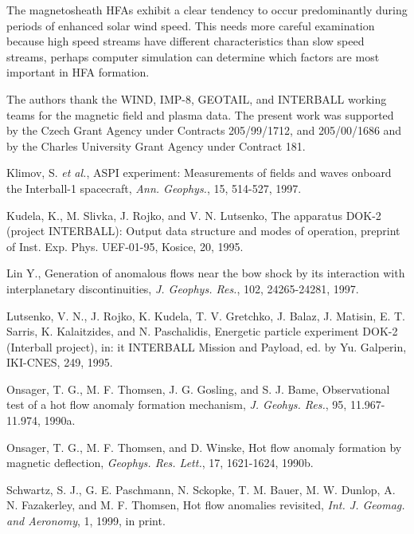 \documentclass[11pt]{article}
\begin{document}
\begin{article}
The magnetosheath HFAs exhibit a clear tendency to occur
predominantly during periods of enhanced solar wind speed.
This needs more careful examination because high speed streams
have different characteristics than slow speed streams,
perhaps computer simulation can determine which factors are
most important in HFA formation.

\acknowledgments %
{The authors thank the WIND, IMP-8, GEOTAIL, and INTERBALL working
teams for the
magnetic field and plasma data. The  present  work  was  supported by
the Czech  Grant  Agency  under  Contracts  205/99/1712, and
205/00/1686 and by the Charles University Grant Agency under
Contract 181.}

\begin{references}

{}
Klimov, S. {\it et al.}, ASPI experiment: Measurements of fields and
waves onboard the Interball-1 spacecraft, {\it Ann. Geophys.}, 15,
514-527, 1997.

Kudela, K., M. Slivka, J. Rojko, and V. N. Lutsenko, The
apparatus DOK-2 (project INTERBALL): Output data structure and
modes of operation, preprint of Inst. Exp. Phys. UEF-01-95,
Kosice, 20, 1995.

Lin Y., Generation of anomalous flows near the bow shock by
its interaction with interplanetary discontinuities, {\it J. Geophys.
Res.}, 102, 24265-24281, 1997.

Lutsenko, V. N., J. Rojko, K. Kudela, T. V. Gretchko, J. Balaz,
J. Matisin, E. T. Sarris, K. Kalaitzides, and N. Paschalidis,
Energetic particle experiment DOK-2 (Interball project), in:
{it INTERBALL Mission and Payload,} ed. by Yu. Galperin, IKI-CNES,
249, 1995.


Onsager, T. G., M. F. Thomsen, J. G. Gosling, and S. J.
Bame, Observational test of a hot flow anomaly formation
mechanism, {\it J. Geohys. Res.}, 95, 11.967-11.974, 1990a.

Onsager, T. G., M. F. Thomsen, and D. Winske,
Hot flow anomaly formation by magnetic deflection,
{\it Geophys. Res. Lett.}, 17, 1621-1624, 1990b.

Schwartz, S. J., G. E. Paschmann, N. Sckopke, T. M. Bauer, M. W.
Dunlop, A. N. Fazakerley, and M. F. Thomsen,  Hot flow anomalies
revisited, {\it Int. J. Geomag. and Aeronomy}, 1, 1999, in print.

\end{references}







\end{article}
\end{document}
